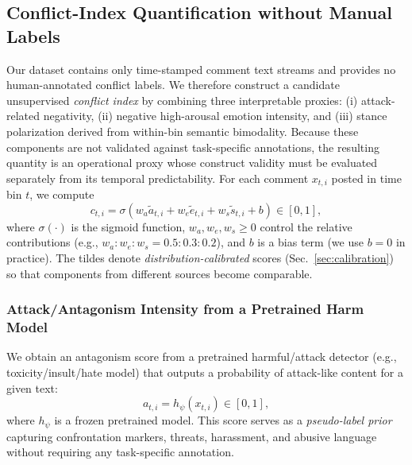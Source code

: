 \documentclass[journal]{IEEEtran}
\begin{document}
\subsection{Conflict-Index Quantification without Manual Labels}\label{sec:conflict_index}

Our dataset contains only time-stamped comment text streams and provides no human-annotated conflict labels. We therefore construct a candidate unsupervised \emph{conflict index} by combining three interpretable proxies: (i) attack-related negativity, (ii) negative high-arousal emotion intensity, and (iii) stance polarization derived from within-bin semantic bimodality. Because these components are not validated against task-specific annotations, the resulting quantity is an operational proxy whose construct validity must be evaluated separately from its temporal predictability. For each comment $x_{t,i}$ posted in time bin $t$, we compute
\begin{equation}
c_{t,i} = \sigma\!\left(w_a \tilde{a}_{t,i} + w_e \tilde{e}_{t,i} + w_s \tilde{s}_{t,i} + b\right)\in[0,1],
\label{eq:conflict_index_fusion}
\end{equation}
where $\sigma(\cdot)$ is the sigmoid function, $w_a,w_e,w_s \ge 0$ control the relative contributions (e.g., $w_a:w_e:w_s = 0.5:0.3:0.2$), and $b$ is a bias term (we use $b=0$ in practice). The tildes denote \emph{distribution-calibrated} scores (Sec.~\ref{sec:calibration}) so that components from different sources become comparable.

\subsubsection{Attack/Antagonism Intensity from a Pretrained Harm Model}
We obtain an antagonism score from a pretrained harmful/attack detector (e.g., toxicity/insult/hate model) that outputs a probability of attack-like content for a given text:
\begin{equation}
a_{t,i} = h_{\psi}(x_{t,i}) \in [0,1],
\label{eq:attack_score}
\end{equation}
where $h_{\psi}$ is a frozen pretrained model. This score serves as a \emph{pseudo-label prior} capturing confrontation markers, threats, harassment, and abusive language without requiring any task-specific annotation.
\end{document}
